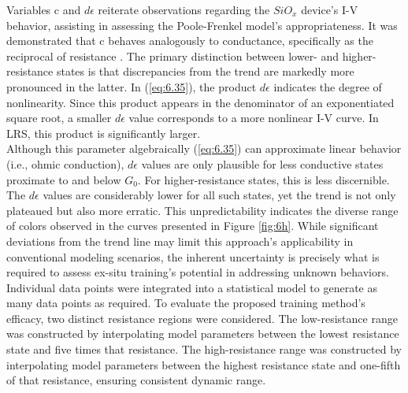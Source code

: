 \noindent Variables c and $d\epsilon$ reiterate observations regarding the $SiO_x$  device's I-V behavior, assisting in assessing the Poole-Frenkel model's appropriateness. It was demonstrated that c behaves analogously to conductance, specifically as the reciprocal of resistance \cite{joksas2022memristive}. The primary distinction between lower- and higher-resistance states is that discrepancies from the trend are markedly more pronounced in the latter. In (\ref{eq:6.35}), the product $d\epsilon$ indicates the degree of nonlinearity. Since this product appears in the denominator of an exponentiated square root, a smaller $d\epsilon$ value corresponds to a more nonlinear I-V curve. In LRS, this product is significantly larger. \\

\noindent Although this parameter algebraically (\ref{eq:6.35}) can approximate linear behavior (i.e., ohmic conduction), $d\epsilon$ values are only plausible for less conductive states proximate to and below $G_0$. For higher-resistance states, this is less discernible. The $d\epsilon$ values are considerably lower for all such states, yet the trend is not only plateaued but also more erratic. This unpredictability indicates the diverse range of colors observed in the curves presented in Figure \ref{fig:6h}. While significant deviations from the trend line may limit this approach's applicability in conventional modeling scenarios, the inherent uncertainty is precisely what is required to assess ex-situ training's potential in addressing unknown behaviors.\\


\noindent Individual data points were integrated into a statistical model to generate as many data points as required. To evaluate the proposed training method's efficacy, two distinct resistance regions were considered. The low-resistance range was constructed by interpolating model parameters between the lowest resistance state and five times that resistance. The high-resistance range was constructed by interpolating model parameters between the highest resistance state and one-fifth of that resistance, ensuring consistent dynamic range.\\

